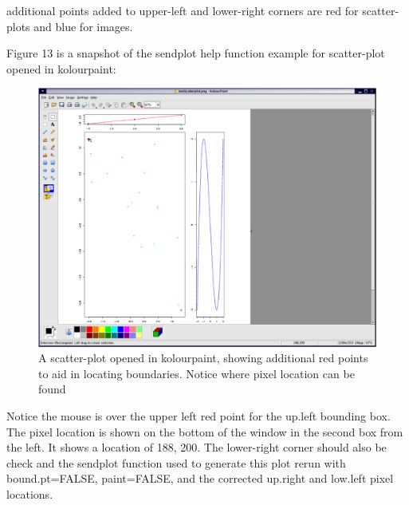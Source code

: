 \documentclass[]{article}
\begin{document}
 additional points added to upper-left and lower-right corners are red for scatter-plots and blue for 
images. \newline

 \indent Figure 13 is a snapshot of the sendplot help function example for scatter-plot opened in kolourpaint:

\begin{center}
\begin{figure}
\includegraphics{sendPlot2}
\caption{A scatter-plot opened in kolourpaint, showing additional red points to aid in locating boundaries. Notice where pixel location can be found}
\end{figure}
\end{center}

\indent  Notice the mouse is over the upper left red point for the up.left bounding box. The pixel location is shown on the bottom of the window in the second box from the left. It shows a location of 188, 200. The lower-right corner should also be check and the sendplot function used to generate this plot rerun with bound.pt=FALSE, paint=FALSE, and the corrected up.right and low.left pixel locations. \\
\end{document}

